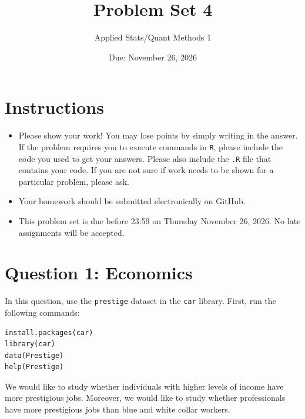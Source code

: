 \documentclass[12pt,letterpaper]{article}
\title{Problem Set 4}
\date{Due: November 26, 2026}
\author{Applied Stats/Quant Methods 1}
\begin{document}
	\maketitle
	\section*{Instructions}
	\begin{itemize}
		\item Please show your work! You may lose points by simply writing in the answer. If the problem requires you to execute commands in \texttt{R}, please include the code you used to get your answers. Please also include the \texttt{.R} file that contains your code. If you are not sure if work needs to be shown for a particular problem, please ask.
		\item Your homework should be submitted electronically on GitHub.
		\item This problem set is due before 23:59 on Thursday November 26, 2026. No late assignments will be accepted.
	\end{itemize}



	\vspace{.5cm}
\section*{Question 1: Economics}
\vspace{.25cm}
\noindent 	
In this question, use the \texttt{prestige} dataset in the \texttt{car} library. First, run the following commands:

\begin{verbatim}
install.packages(car)
library(car)
data(Prestige)
help(Prestige)
\end{verbatim} 


\noindent We would like to study whether individuals with higher levels of income have more prestigious jobs. Moreover, we would like to study whether professionals have more prestigious jobs than blue and white collar workers.
\end{document}
